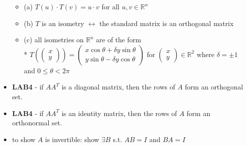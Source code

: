 \documentclass[10pt]{article}
\let\iff\leftrightarrow
\begin{document}
\begin{itemize}
    \begin{itemize}
        \item (a) $T(u) \cdot T(v) = u \cdot v$ for all $u, v \in \mathbb{R}^n$
        \item (b) $T$ is an isometry $\iff$ the standard matrix is an orthogonal matrix
        \item (c) all isometries on $\mathbb{R}^n$ are of the form
            \\* $T(\begin{pmatrix}
                x\\y
            \end{pmatrix}) = \begin{pmatrix}
                x\cos\theta + \delta y\sin\theta \\
                y\sin\theta - \delta y\cos\theta
            \end{pmatrix}$ for $\begin{pmatrix}
                x\\y
            \end{pmatrix} \in \mathbb{R}^2$
            where $\delta = \pm 1$ and $0 \leq \theta < 2\pi$
    \end{itemize}
    \item \textbf{LAB4} - if $AA^T$ is a diagonal matrix, then the rows of $A$ form an orthogonal set.
    \item \textbf{LAB4} - if $AA^T$ is an identity matrix, then the rows of $A$ form an orthonormal set.
\end{itemize}

\begin{itemize}
    \item to show $A$ is invertible: show $\exists B$ s.t. $AB = I$ and $BA=I$
\end{itemize}
\end{document}
